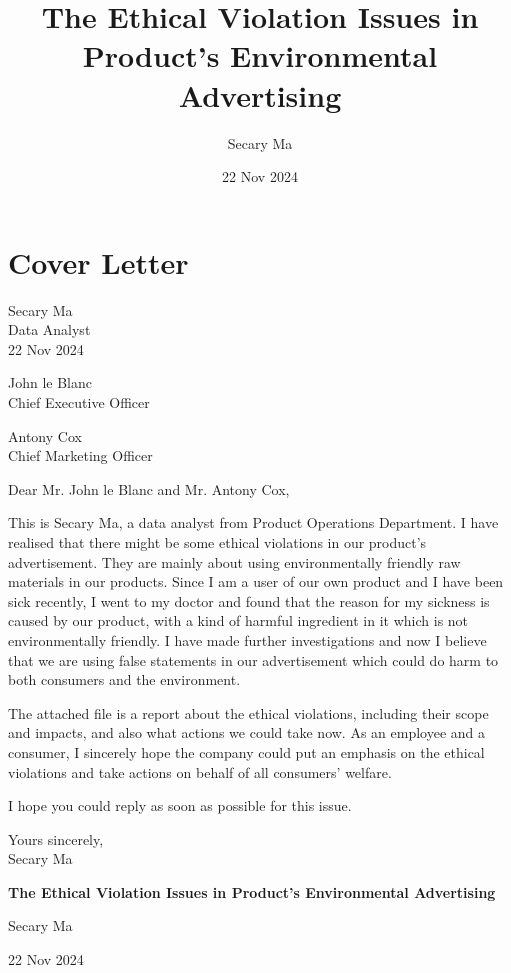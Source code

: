 \documentclass[12pt]{article}
\title{\textbf{The Ethical Violation Issues in Product's Environmental Advertising}}
\author{Secary Ma}
\date{22 Nov 2024}
\begin{document}

\section*{Cover Letter}

Secary Ma\\
Data Analyst\\
22 Nov 2024

\vspace{1em}

John le Blanc\\
Chief Executive Officer

\vspace{1em}

Antony Cox\\
Chief Marketing Officer

\vspace{1em}

Dear Mr. John le Blanc and Mr. Antony Cox,

This is Secary Ma, a data analyst from Product Operations Department. I have realised that there might be some ethical violations in our product's advertisement. They are mainly about using environmentally friendly raw materials in our products. Since I am a user of our own product and I have been sick recently, I went to my doctor and found that the reason for my sickness is caused by our product, with a kind of harmful ingredient in it which is not environmentally friendly. I have made further investigations and now I believe that we are using false statements in our advertisement which could do harm to both consumers and the environment.

The attached file is a report about the ethical violations, including their scope and impacts, and also what actions we could take now. As an employee and a consumer, I sincerely hope the company could put an emphasis on the ethical violations and take actions on behalf of all consumers' welfare.

I hope you could reply as soon as possible for this issue.

\vspace{1em}

Yours sincerely,\\
Secary Ma

\clearpage

\begin{titlepage}
  \centering
  \vspace*{\fill}
  {\LARGE\bfseries The Ethical Violation Issues in Product's Environmental Advertising\par}
  \vspace{2em}
  {\large Secary Ma\par}
  \vspace{0.5em}
  {\large 22 Nov 2024\par}
  \vspace*{\fill}
\end{titlepage}
\end{document}
